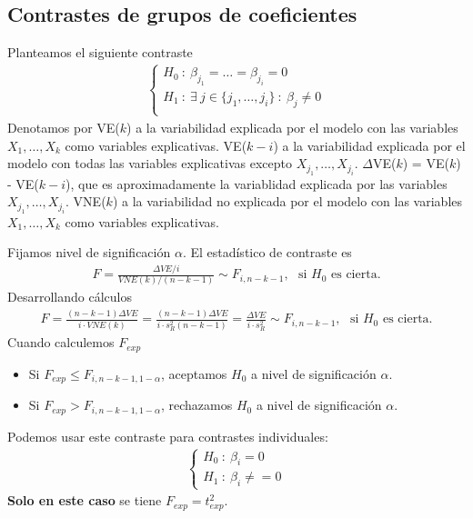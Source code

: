 \subsection{Contrastes de grupos de coeficientes}
Planteamos el siguiente contraste
\begin{align*}
    \left\{ \begin{array}{lcc}
                H_0 \ : \ \beta_{j_1} = \ldots = \beta_{j_i} = 0                    \\
                H_1 \ : \ \exists \ j \in \{j_1,\ldots,j_i\} \ : \ \beta_j \not = 0 \\
            \end{array}
    \right.
\end{align*}
Denotamos por VE($k$) a la variabilidad explicada por el modelo con las variables $X_{1},\ldots,X_{k}$ como variables explicativas. VE($k-i$) a la variabilidad explicada por el modelo con todas las variables explicativas excepto $X_{j_1},\ldots,X_{j_i}$. $\Delta$VE($k$) = VE($k$) - VE($k-i$), que es aproximadamente la variablidad explicada por las variables $X_{j_1},\ldots,X_{j_i}$. VNE($k$) a la variabilidad no explicada por el modelo con las variables $X_{1},\ldots,X_{k}$ como variables explicativas.

Fijamos nivel de significación $\alpha$. El estadístico de contraste es
\begin{align*}
    F = \frac{\Delta VE / i}{VNE(k)/(n-k-1)} \sim F_{i,n-k-1}, \ \ \ \text{si $H_0$ es cierta}.
\end{align*}
Desarrollando cálculos
\begin{align*}
    F = \frac{(n-k-1)\Delta VE}{i \cdot VNE(k)} = \frac{(n-k-1)\Delta VE}{i \cdot s_R^2(n-k-1)} = \frac{\Delta VE}{i \cdot s_R^2} \sim F_{i,n-k-1}, \ \ \ \text{si $H_0$ es cierta}.
\end{align*}
Cuando calculemos $F_{exp}$
\begin{itemize}
    \item Si $F_{exp} \leq F_{i,n-k-1,1-\alpha}$, aceptamos $H_0$ a nivel de significación $\alpha$.
    \item Si $F_{exp} > F_{i,n-k-1,1-\alpha}$, rechazamos $H_0$ a nivel de significación $\alpha$.
\end{itemize}

\begin{obs}
    Podemos usar este contraste para contrastes individuales:
    \begin{align*}
        \left\{ \begin{array}{lcc}
                    H_0 \ : \ \beta_{i} = 0 \\
                    H_1 \ : \ \beta_i \neq = 0
                \end{array}
        \right.
    \end{align*}
    \textbf{Solo en este caso} se tiene $F_{exp} = t_{exp}^2$.
\end{obs}


